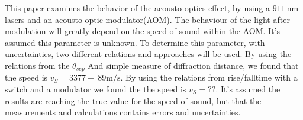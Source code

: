 \documentclass[main]{subfiles}
\begin{document}
This paper examines the behavior of the acousto optics effect, by using a $\SI{911}{\nano\meter}$ lasers and  an acousto-optic modulator(AOM). The behaviour of the light after modulation will greatly depend on the speed of sound within the AOM. It’s assumed this parameter is unknown. To determine this parameter, with uncertainties, two different relations and approaches will be used. By using the relations from the $\theta_{sep}$ And simple measure of diffraction distance, we found that the speed is $v_S = 3377 \pm \ 89 \si{\meter\per\second}$. By using the relations from rise/falltime with a switch and a modulator we found the the speed is $v_S = ??$. It’s assumed the results are reaching the true value for the speed of sound, but that the measurements and calculations contains errors and uncertainties.
\end{document}
